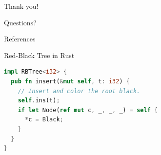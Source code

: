 \begin{frame}[standout]
Thank you!
\end{frame}

\begin{frame}[standout]
Questions?
\end{frame}


\begin{frame}[allowframebreaks]{References}
  
  
\end{frame}


\appendix

\begin{frame}[fragile]{Red-Black Tree in Rust}
\begin{lstlisting}[language=Rust, caption={Insert method}]
impl RBTree<i32> {
  pub fn insert(&mut self, t: i32) {
    // Insert and color the root black.
    self.ins(t);
    if let Node(ref mut c, _, _, _) = self {
      *c = Black;
    }
  }
}
\end{lstlisting}
\end{frame}

